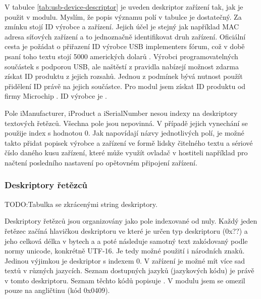 \FloatBarrier
V tabulce \ref{tab:usb-device-descriptor} je uveden deskriptor zařízení tak, jak je použit v modulu. Myslím, že popis významu  polí v tabulce je dostatečný.  Za zmínku stojí ID výrobce a zařízení. Jejich účel je stejný jak například MAC adresa síťových zařízení a to jednoznačně identifikovat druh zařízení. Oficiální cesta je požádat o přiřazení ID výrobce USB implementers fórum, což v době psaní toho textu stojí 5000 amerických dolarů \cite{usb-vid}. Výrobci programovatelných součástek s podporou USB, ale naštěstí z pravidla nabízejí možnost zdarma získat ID produktu z jejich rozsahů. Jednou z podmínek bývá nutnost použít přidělení ID  právě na jejich součástce. Pro modul jsem získat ID produktu od firmy Microchip \PID. ID výrobce je \VID.

Pole iManufacturer, iProduct a iSerialNumber nesou indexy na deskriptory textových řetězců. Všechna pole jsou nepovinná. V případě jejich vynechání se použije index s hodnotou 0. Jak napovídají názvy jednotlivých polí, je možné takto přidat popisek výrobce a zařízení ve formě lidsky čitelného textu a sériové číslo daného kusu zařízení, které může využít ovladač v hostiteli například pro načtení posledního nastavení po opětovném připojení zařízení.

\subsubsection{Deskriptory řetězců}
TODO:Tabulka se zkrácenými string deskriptory.

Deskriptory řetězců jsou organizovány jako pole indexované od nuly. Každý jeden řetězec začíná hlavičkou deskriptoru ve které je určen typ deskriptoru (0x??) a jeho celková délka v bytech a a poté následuje samotný text zakódovaný podle normy unicode, konkrétně UTF-16. Je tedy možné použití i národních znaků.\\
Jedinou výjimkou je deskriptor s indexem 0. V zařízení je možné mít více sad textů v různých jazycích. Seznam dostupných jazyků (jazykových kódu) je právě v tomto deskriptoru. Seznam těchto kódů popisuje \cite{usb-lang}. V modulu jsem se omezil pouze na angličtinu (kód 0x0409).

